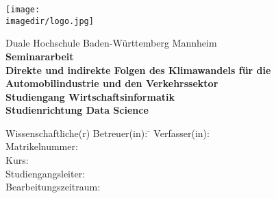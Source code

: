 \begin{titlepage}
	\begin{minipage}{\textwidth}
		\vspace{-2cm}
		\noindent \hfill \texttt{[image: \\imagedir/logo.jpg]}
	\end{minipage}
	\vspace{1em}
	\begin{center}
		{\textsf{\large Duale Hochschule Baden-W\"urttemberg Mannheim}}\\[4em]
		{\textsf{\textbf{\large{Seminararbeit}}}}\\[6mm]
		{\textsf{\textbf{\Large{}Direkte und indirekte Folgen des Klimawandels für die Automobilindustrie und
				den Verkehrssektor}}} \\[1.5cm]
		{\textsf{\textbf{\large{}Studiengang Wirtschaftsinformatik}}\\[6mm]
		\textsf{\textbf{Studienrichtung Data Science}}}\vspace{10em}

		\begin{minipage}{\textwidth}
			\begin{tabbing}
				Wissenschaftliche(r) Betreuer(in): \hspace{0.85cm}\=\kill
				Verfasser(in): \> \DerAutorDerArbeit \\[1.5mm]
				Matrikelnummer: \> \DieMatrikelnummer \\[1.5mm]
				Kurs: \> \DieKursbezeichnung \\[1.5mm]
				Studiengangsleiter: \> \DerStudiengangsleiter \\[1.5mm]
				Bearbeitungszeitraum: \> \DerBearbeitungszeitraum\\[1.5mm]
			\end{tabbing}
		\end{minipage}
	\end{center}
\end{titlepage}